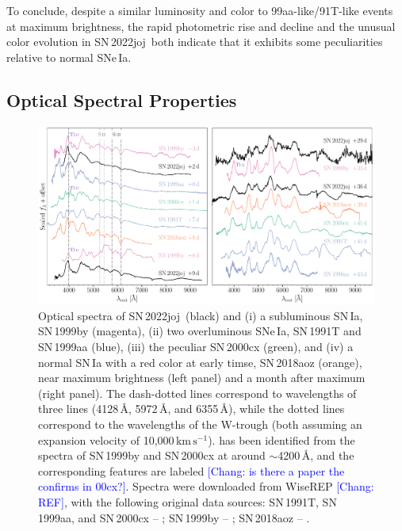 \documentclass[twocolumn]{aastex631}
\newcommand{\sn}{SN\,2022joj}
\newcommand{\kms}{$\mathrm{km}\,\mathrm{s}^{-1}$}
\newcommand{\chang}[1]{\textcolor{blue}{[Chang: #1]}}
\begin{document}
\begin{CJK*}{UTF8}{gbsn}
To conclude, despite a similar luminosity and color to 99aa-like/91T-like events at maximum brightness, the rapid photometric rise and decline and the unusual color evolution in \sn\ both indicate that it exhibits some peculiarities relative to normal SNe\,Ia.

\subsection{Optical Spectral Properties} 
\label{sec:analysis_spec}


\begin{figure}
    \centering
    \includegraphics[width=\linewidth]{spec_comp.pdf}
    \caption{Optical spectra of \sn\ (black) and (i) a subluminous SN\,Ia, SN\,1999by (magenta), (ii) two overluminous SNe\,Ia, SN\,1991T and SN\,1999aa (blue), (iii) the peculiar SN\,2000cx (green), and (iv) a normal SN\,Ia with a red color at early timse, SN\,2018aoz (orange), near maximum brightness (left panel) and a month after maximum (right panel). The dash-dotted lines correspond to wavelengths of three  lines (4128\,\r{A}, 5972\,\r{A}, and 6355\,\r{A}), while the dotted lines correspond to the wavelengths of the  W-trough (both assuming an expansion velocity of 10,000\,\kms).  has been identified from the spectra of SN\,1999by and SN\,2000cx at around $\sim$4200\,\r{A}, and the corresponding features are labeled \chang{is there a paper the confirms  in 00cx?}. Spectra were downloaded from WiseREP \chang{REF}, with the following original data sources: SN\,1991T, SN\,1999aa, and SN\,2000cx -- \citet{Silverman_UCBIa_2012}; SN\,1999by -- \citet{Matheson_cfaIa_2008}; SN\,2018aoz -- \citet{Ni_18aoz_2023}.}
    \label{fig:spec_comp}
\end{figure}
\begin{figure}

\end{figure}
\end{CJK*}
\end{document}
